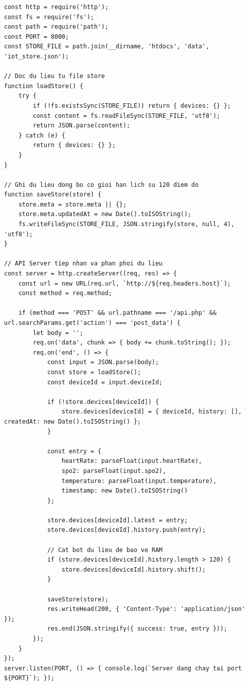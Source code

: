 \begin{lstlisting}
const http = require('http');
const fs = require('fs');
const path = require('path');
const PORT = 8000;
const STORE_FILE = path.join(__dirname, 'htdocs', 'data', 'iot_store.json');

// Doc du lieu tu file store
function loadStore() {
    try {
        if (!fs.existsSync(STORE_FILE)) return { devices: {} };
        const content = fs.readFileSync(STORE_FILE, 'utf8');
        return JSON.parse(content);
    } catch (e) {
        return { devices: {} };
    }
}

// Ghi du lieu dong bo co gioi han lich su 120 diem do
function saveStore(store) {
    store.meta = store.meta || {};
    store.meta.updatedAt = new Date().toISOString();
    fs.writeFileSync(STORE_FILE, JSON.stringify(store, null, 4), 'utf8');
}

// API Server tiep nhan va phan phoi du lieu
const server = http.createServer((req, res) => {
    const url = new URL(req.url, `http://${req.headers.host}`);
    const method = req.method;

    if (method === 'POST' && url.pathname === '/api.php' && url.searchParams.get('action') === 'post_data') {
        let body = '';
        req.on('data', chunk => { body += chunk.toString(); });
        req.on('end', () => {
            const input = JSON.parse(body);
            const store = loadStore();
            const deviceId = input.deviceId;
            
            if (!store.devices[deviceId]) {
                store.devices[deviceId] = { deviceId, history: [], createdAt: new Date().toISOString() };
            }
            
            const entry = {
                heartRate: parseFloat(input.heartRate),
                spo2: parseFloat(input.spo2),
                temperature: parseFloat(input.temperature),
                timestamp: new Date().toISOString()
            };
            
            store.devices[deviceId].latest = entry;
            store.devices[deviceId].history.push(entry);
            
            // Cat bot du lieu de bao ve RAM
            if (store.devices[deviceId].history.length > 120) {
                store.devices[deviceId].history.shift();
            }
            
            saveStore(store);
            res.writeHead(200, { 'Content-Type': 'application/json' });
            res.end(JSON.stringify({ success: true, entry }));
        });
    }
});
server.listen(PORT, () => { console.log(`Server dang chay tai port ${PORT}`); });
\end{lstlisting}

